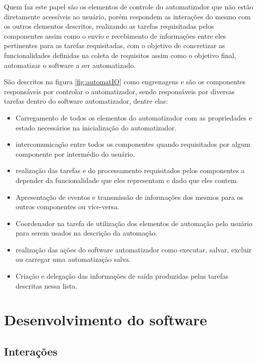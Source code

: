 \documentclass[tg]{mdtufsm}
\begin{document}
                    Quem faz este papel são os elementos de controle do automatizador que não estão diretamente acessíveis ao usuário, porém respondem as interações do mesmo com os outros elementos descritos, realizando as tarefas requisitadas pelos componentes assim como o envio e recebimento de informações entre eles pertinentes para as tarefas requisitadas, com o objetivo de concretizar as funcionalidades definidas na coleta de requisitos assim como o objetivo final, automatizar o software a ser automatizado.

                    São descritos na figura \ref{fig:automatIO} como engrenagens e são os componentes responsáveis por controlar o automatizador, sendo responsáveis por diversas tarefas dentro do software automatizador, dentre elas:

                    \begin{itemize}
                        \item Carregamento de todos os elementos do automatizador com as propriedades e estado necessários na inicialização do automatizador.
                        \item intercomunicação entre todos os componentes quando requisitados por algum componente por intermédio do usuário.
                        \item realização das tarefas e do processamento requisitados pelos componentes a depender da funcionalidade que eles representam e dado que eles contem.
                        \item Apresentação de eventos e transmissão de informações dos mesmos para os outros componentes ou vice-versa.
                        \item Coordenador na tarefa de utilização dos elementos de automação pelo usuário para serem usados na descrição da automação.
                        \item realização das ações do software automatizador como executar, salvar, excluir ou carregar uma automatização salva.
                        \item Criação e delegação das informações de saída produzidas pelas tarefas descritas nessa lista.
                    \end{itemize}

        \section {Desenvolvimento do software}

            \subsection {Interações}
\end{document}
